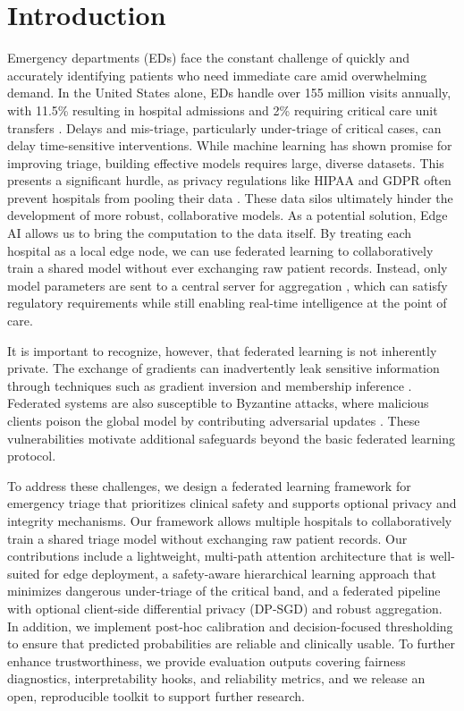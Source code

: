 \documentclass[journal,article,submit,pdftex,moreauthors]{Definitions/mdpi}
\begin{document}
\section{Introduction}\label{sec:intro}

Emergency departments (EDs) face the constant challenge of quickly and accurately identifying patients who need immediate care amid overwhelming demand. In the United States alone, EDs handle over 155 million visits annually, with 11.5\% resulting in hospital admissions and 2\% requiring critical care unit transfers \cite{cdc2022}. Delays and mis-triage, particularly under-triage of critical cases, can delay time-sensitive interventions. While machine learning has shown promise for improving triage, building effective models requires large, diverse datasets. This presents a significant hurdle, as privacy regulations like HIPAA and GDPR often prevent hospitals from pooling their data \cite{voigt2017}. These data silos ultimately hinder the development of more robust, collaborative models. As a potential solution, Edge AI allows us to bring the computation to the data itself. By treating each hospital as a local edge node, we can use federated learning to collaboratively train a shared model without ever exchanging raw patient records. Instead, only model parameters are sent to a central server for aggregation \cite{mcmahan2017,kairouz2021}, which can satisfy regulatory requirements while still enabling real-time intelligence at the point of care.

It is important to recognize, however, that federated learning is not inherently private. The exchange of gradients can inadvertently leak sensitive information through techniques such as gradient inversion and membership inference \cite{zhu2019deep,shokri2017}. Federated systems are also susceptible to Byzantine attacks, where malicious clients poison the global model by contributing adversarial updates \cite{blanchard2017,yin2018byzantine}. These vulnerabilities motivate additional safeguards beyond the basic federated learning protocol.

To address these challenges, we design a federated learning framework for emergency triage that prioritizes clinical safety and supports optional privacy and integrity mechanisms. Our framework allows multiple hospitals to collaboratively train a shared triage model without exchanging raw patient records. Our contributions include a lightweight, multi-path attention architecture that is well-suited for edge deployment, a safety-aware hierarchical learning approach that minimizes dangerous under-triage of the critical band, and a federated pipeline with optional client-side differential privacy (DP-SGD) and robust aggregation. In addition, we implement post-hoc calibration and decision-focused thresholding to ensure that predicted probabilities are reliable and clinically usable. To further enhance trustworthiness, we provide evaluation outputs covering fairness diagnostics, interpretability hooks, and reliability metrics, and we release an open, reproducible toolkit to support further research.
\end{document}
